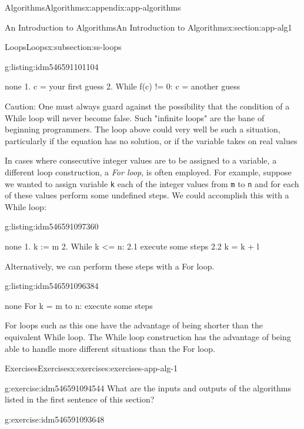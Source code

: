 \documentclass[oneside,10pt,]{book}
\newcommand{\mono}[1]{\texttt{#1}}
\numberwithin{equation}{section}
\begin{document}
\begin{appendixptx}{Algorithms}{}{Algorithms}{}{}{x:appendix:app-algorithms}
\begin{sectionptx}{An Introduction to Algorithms}{}{An Introduction to Algorithms}{}{}{x:section:app-alg1}
\begin{subsectionptx}{Loops}{}{Loops}{}{}{x:subsection:ss-loops}
\begin{listingptx}{}{g:listing:idm546591101104}{}
\begin{program}{none}
1. c = your first guess
2. While f(c) != 0:
		c = another guess
\end{program}
\tcblower
\end{listingptx}%
Caution: One must always guard against the possibility that the condition of a While loop will never become false. Such "infinite loops" are the bane of beginning programmers. The loop above could very well be such a situation, particularly if the equation has no solution, or if the variable takes on real values%
\par
In cases where  consecutive integer values are to be assigned to a variable, a different loop construction, a \emph{For loop}, is often employed. For example, suppose we wanted to assign variable \mono{k} each of the integer values from \mono{m} to \mono{n} and for each of these values perform some undefined steps. We could accomplish this with a While loop:%
\begin{listingptx}{}{g:listing:idm546591097360}{}%
\begin{program}{none}
1. k := m
2. While k <= n:
	2.1 execute some steps
	2.2 k = k + l
\end{program}
\tcblower
\end{listingptx}%
Alternatively, we can perform these steps with a For loop.%
\begin{listingptx}{}{g:listing:idm546591096384}{}%
\begin{program}{none}
For k = m to n:
	execute some  steps
\end{program}
\tcblower
\end{listingptx}%
For loops such as this one have the advantage of being shorter than the equivalent While loop. The While loop construction has the advantage of being able to handle more different situations than the For loop.%
\end{subsectionptx}
%
%
\typeout{************************************************}
\typeout{************************************************}
%
\begin{exercises-subsection}{Exercises}{}{Exercises}{}{}{x:exercises:exercises-app-alg-1}
\begin{divisionexercise}{1}{}{}{g:exercise:idm546591094544}%
What are the inputs and outputs of the algorithms listed in the first sentence of this section?%
\end{divisionexercise}%
\begin{divisionexercise}{2}{}{}{g:exercise:idm546591093648}%

\end{divisionexercise}
\end{exercises-subsection}
\end{sectionptx}
\end{appendixptx}
\end{document}
